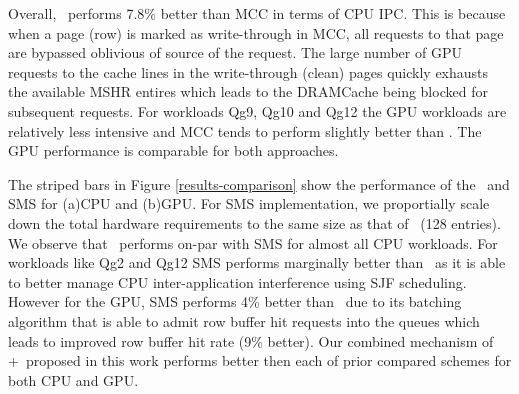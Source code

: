 \par Overall, \bypassname\ performs 7.8\% better than MCC in terms of CPU IPC. This is because when a page (row) is marked as write-through in MCC, all requests to that page are bypassed oblivious of source of the request. The large number of GPU requests to the cache lines in the write-through (clean) pages quickly exhausts the available MSHR entires which leads to the DRAMCache being blocked for subsequent requests. For workloads Qg9, Qg10 and Qg12 the GPU workloads are relatively less intensive and MCC tends to perform slightly better than \bypassname. The GPU performance is comparable for both approaches.
\par The striped bars in Figure \ref{results-comparison} show the performance of the \prioname\ and SMS for (a)CPU and (b)GPU. For SMS implementation, we proportially scale down the total hardware requirements to the same size as that of \prioname\ (128 entries). We observe that \prioname\ performs on-par with SMS for almost all CPU workloads. For workloads like Qg2 and Qg12 SMS performs marginally better than \prioname\ as it is able to better manage CPU inter-application interference using SJF scheduling. However for the GPU, SMS performs 4\% better than \prioname\ due to its batching algorithm that is able to admit row buffer hit requests into the queues which leads to improved row buffer hit rate (9\% better). Our combined mechanism of \prioname+\bypassname\ proposed in this work performs better then each of prior compared schemes for both CPU and GPU.
